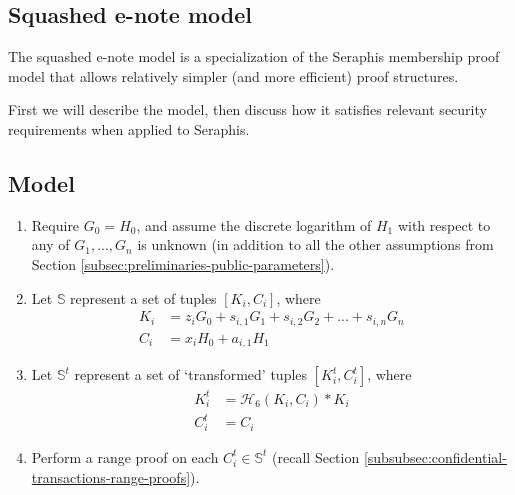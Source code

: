 \begin{appendices}

\renewcommand{\theFancyVerbLine}{%
	\textcolor{red}{\small
		\arabic{FancyVerbLine}}}

\section{Squashed e-note model}
\label{appendix:squashed-e-note-model}

The squashed e-note model is a specialization of the Seraphis membership proof model that allows relatively simpler (and more efficient) proof structures.

First we will describe the model, then discuss how it satisfies relevant security requirements when applied to Seraphis.


\subsection{Model}
\label{appendix:squashed-e-note-model-model}

\begin{enumerate}
    \item Require $G_0 = H_0$, and assume the discrete logarithm of $H_1$ with respect to any of $G_1,...,G_n$ is unknown (in addition to all the other assumptions from Section \ref{subsec:preliminaries-public-parameters}).

    \item Let $\mathbb{S}$ represent a set of tuples $[K_i, C_i]$, where\vspace{.115cm}
    \begin{align*}
        K_i &= z_i G_0 + s_{i,1} G_1 + s_{i,2} G_2 + ... + s_{i,n} G_n \\
        C_i &= x_i H_0 + a_{i,1} H_1
    \end{align*}

    \item Let $\mathbb{S}^t$ represent a set of `transformed' tuples $[K^t_i, C^t_i]$, where\vspace{.115cm}
    \begin{align*}
        K^t_i &= \mathcal{H}_6(K_i, C_i)*K_i \\
        C^t_i &= C_i
    \end{align*}

    \item Perform a range proof on each $C^t_i \in \mathbb{S}^t$ (recall Section \ref{subsubsec:confidential-transactions-range-proofs}).


\end{enumerate}
\end{appendices}
